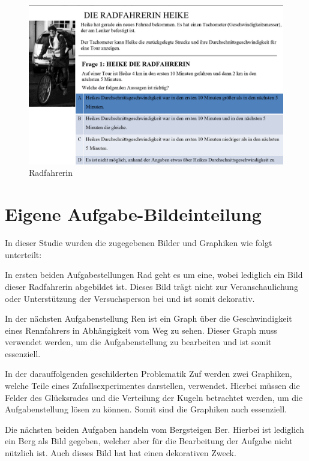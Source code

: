 \begin{figure}[H]
\noindent\hspace{0.5mm}\includegraphics[width=17cm]{./Ressourcen/Radfahrerin.png}
\caption{Radfahrerin}
\end{figure}

\section{Eigene Aufgabe-Bildeinteilung}

In dieser Studie wurden die zugegebenen Bilder und Graphiken wie folgt unterteilt:

In ersten beiden Aufgabestellungen \gls{Rad} geht es um eine, wobei lediglich ein Bild dieser Radfahrerin abgebildet ist. Dieses Bild trägt nicht zur Veranschaulichung oder Unterstützung der Versuchsperson bei und ist somit dekorativ. 


In der nächsten Aufgabenstellung \gls{Ren} ist ein Graph über die Geschwindigkeit eines  Rennfahrers in Abhängigkeit vom Weg zu sehen. Dieser Graph muss verwendet werden, um die Aufgabenstellung zu bearbeiten und ist somit essenziell. 


In der darauffolgenden geschilderten Problematik \gls{Zuf} werden zwei Graphiken, welche Teile eines Zufallsexperimentes darstellen, verwendet. Hierbei müssen die Felder des Glücksrades und die Verteilung der Kugeln betrachtet werden, um die Aufgabenstellung lösen zu können. Somit sind die Graphiken auch essenziell.


Die nächsten beiden Aufgaben handeln vom Bergsteigen \gls{Ber}. Hierbei ist lediglich ein Berg als Bild gegeben, welcher aber für die Bearbeitung der Aufgabe nicht nützlich ist. Auch dieses Bild hat hat einen dekorativen Zweck.


